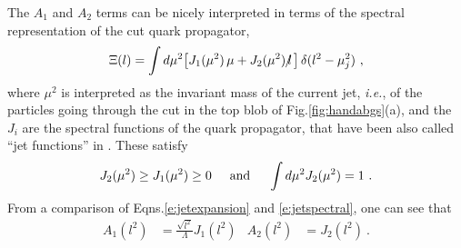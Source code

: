 \documentclass[preprintnumbers,floatfix,nofootinbib]{revtex4}
\newcommand{\lslash}{l \hspace{-0.19cm} / \,}
\begin{document}
The $A_1$ and $A_2$ terms can be nicely interpreted in terms of the spectral representation of the cut quark propagator,
\begin{align} 
  \Xi(l) =  
  \int d \mu^2 \big[ J_1 (\mu^2)\,\mu + J_2 (\mu^2)\,\lslash \big] \,
  \delta(l^2 -\mu_j^2) \ ,
\label{e:jetspectral}
\end{align}
where $\mu^2$ is interpreted as the invariant mass of the current jet, {\it i.e.}, of the particles going through the cut in the top blob of Fig.\ref{fig:handabgs}(a), and the $J_i$ are the spectral functions of the quark propagator, that have been also called ``jet functions'' in \cite{Accardi-Qiu}. These satisfy \cite{D'Hoker-lecture-notes,Romao-lecture-notes}
\begin{align}
  J_2(\mu^2) \geq J_1(\mu^2) \geq 0
  \hspace*{0.5cm} \text{and} \hspace*{0.5cm}
  \int d\mu^2 J_2(\mu^2) = 1 \ .
\label{eq:jetfnsprops}
\end{align}
From a comparison of Eqns.\eqref{e:jetexpansion} and \eqref{e:jetspectral}, one can see that 
\begin{align}
  A_1(l^2)&=\frac{\sqrt{l^2}}{\Lambda}J_1(l^2) & A_2(l^2)&=J_2(l^2) \ .
  \label{eq:jet_vs_spectral}
\end{align}
\end{document}

